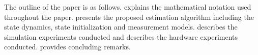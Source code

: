 
The outline of the paper is as follows.
 explains the mathematical notation used throughout the paper.
 presents the proposed estimation algorithm including the
state dynamics, state initialization and measurement models.
 describes the simulation experiments conducted and
 describes the hardware experiments conducted.
 provides concluding remarks.

